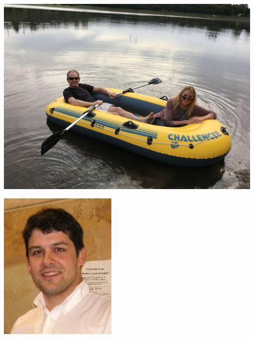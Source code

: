 \documentclass{beamer}
\begin{document}
\begin{frame}
\begin{center}
\includegraphics[scale = 0.04]{IMG_0703.JPG}

\includegraphics[scale = 0.6]{Taylor_2010.jpg}
\end{center}
\end{frame}
\end{document}
